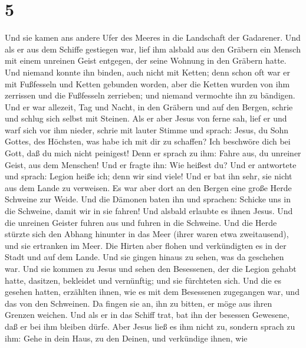 \hypertarget{section-4}{%
\section{5}\label{section-4}}

 Und sie kamen ans andere Ufer des Meeres in die
Landschaft der Gadarener.  Und als er aus dem Schiffe
gestiegen war, lief ihm alsbald aus den Gräbern ein Mensch mit einem
unreinen Geist entgegen,  der seine Wohnung in den Gräbern
hatte. Und niemand konnte ihn binden, auch nicht mit Ketten;
 denn schon oft war er mit Fußfesseln und Ketten gebunden
worden, aber die Ketten wurden von ihm zerrissen und die Fußfesseln
zerrieben; und niemand vermochte ihn zu bändigen.  Und er
war allezeit, Tag und Nacht, in den Gräbern und auf den Bergen, schrie
und schlug sich selbst mit Steinen.  Als er aber Jesus von
ferne sah, lief er und warf sich vor ihm nieder,  schrie
mit lauter Stimme und sprach: Jesus, du Sohn Gottes, des Höchsten, was
habe ich mit dir zu schaffen? Ich beschwöre dich bei Gott, daß du mich
nicht peinigest!  Denn er sprach zu ihm: Fahre aus, du
unreiner Geist, aus dem Menschen!  Und er fragte ihn: Wie
heißest du? Und er antwortete und sprach: Legion heiße ich; denn wir
sind viele!  Und er bat ihn sehr, sie nicht aus dem Lande
zu verweisen.  Es war aber dort an den Bergen eine große
Herde Schweine zur Weide.  Und die Dämonen baten ihn und
sprachen: Schicke uns in die Schweine, damit wir in sie fahren!
 Und alsbald erlaubte es ihnen Jesus. Und die unreinen
Geister fuhren aus und fuhren in die Schweine. Und die Herde stürzte
sich den Abhang hinunter in das Meer (ihrer waren etwa zweitausend), und
sie ertranken im Meer.  Die Hirten aber flohen und
verkündigten es in der Stadt und auf dem Lande. Und sie gingen hinaus zu
sehen, was da geschehen war.  Und sie kommen zu Jesus und
sehen den Besessenen, der die Legion gehabt hatte, dasitzen, bekleidet
und vernünftig; und sie fürchteten sich.  Und die es
gesehen hatten, erzählten ihnen, wie es mit dem Besessenen zugegangen
war, und das von den Schweinen.  Da fingen sie an, ihn zu
bitten, er möge aus ihren Grenzen weichen.  Und als er in
das Schiff trat, bat ihn der besessen Gewesene, daß er bei ihm bleiben
dürfe.  Aber Jesus ließ es ihm nicht zu, sondern sprach
zu ihm: Gehe in dein Haus, zu den Deinen, und verkündige ihnen, wie
